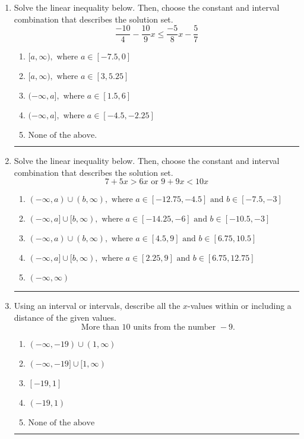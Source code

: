 \documentclass[14pt]{extbook}
\newcommand{\litem}[1]{\item#1\hspace*{-1cm}\rule{\textwidth}{0.4pt}}
\begin{document}
\begin{enumerate}
{\begin{enumerate}[label=\Alph*.]
\end{enumerate} }
\litem{
Solve the linear inequality below. Then, choose the constant and interval combination that describes the solution set.\[ \frac{-10}{4} - \frac{10}{9} x \leq \frac{-5}{8} x - \frac{5}{7} \]\begin{enumerate}[label=\Alph*.]
\item \( [a, \infty), \text{ where } a \in [-7.5, 0] \)
\item \( [a, \infty), \text{ where } a \in [3, 5.25] \)
\item \( (-\infty, a], \text{ where } a \in [1.5, 6] \)
\item \( (-\infty, a], \text{ where } a \in [-4.5, -2.25] \)
\item \( \text{None of the above}. \)

\end{enumerate} }
\litem{
Solve the linear inequality below. Then, choose the constant and interval combination that describes the solution set.\[ 7 + 5 x > 6 x \text{ or } 9 + 9 x < 10 x \]\begin{enumerate}[label=\Alph*.]
\item \( (-\infty, a) \cup (b, \infty), \text{ where } a \in [-12.75, -4.5] \text{ and } b \in [-7.5, -3] \)
\item \( (-\infty, a] \cup [b, \infty), \text{ where } a \in [-14.25, -6] \text{ and } b \in [-10.5, -3] \)
\item \( (-\infty, a) \cup (b, \infty), \text{ where } a \in [4.5, 9] \text{ and } b \in [6.75, 10.5] \)
\item \( (-\infty, a] \cup [b, \infty), \text{ where } a \in [2.25, 9] \text{ and } b \in [6.75, 12.75] \)
\item \( (-\infty, \infty) \)

\end{enumerate} }
\litem{
Using an interval or intervals, describe all the $x$-values within or including a distance of the given values.\[ \text{ More than } 10 \text{ units from the number } -9. \]\begin{enumerate}[label=\Alph*.]
\item \( (-\infty, -19) \cup (1, \infty) \)
\item \( (-\infty, -19] \cup [1, \infty) \)
\item \( [-19, 1] \)
\item \( (-19, 1) \)
\item \( \text{None of the above} \)


\end{enumerate}}
\end{enumerate}
\end{document}

